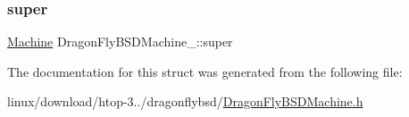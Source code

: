 \mbox{\label{structDragonFlyBSDMachine___a83e5b49a54d0b6242944785583eb8f67}} 
\subsubsection{\texorpdfstring{super}{super}}
{\footnotesize\ttfamily \hyperlink{Machine_8h_aa3706f95e4706b9d02979efcabb1341d}{Machine} Dragon\+Fly\+B\+S\+D\+Machine\+\_\+\+::super}



The documentation for this struct was generated from the following file\+:\begin{DoxyCompactItemize}
\item 
linux/download/htop-\/3../dragonflybsd/\hyperlink{DragonFlyBSDMachine_8h}{Dragon\+Fly\+B\+S\+D\+Machine.\+h}\end{DoxyCompactItemize}
